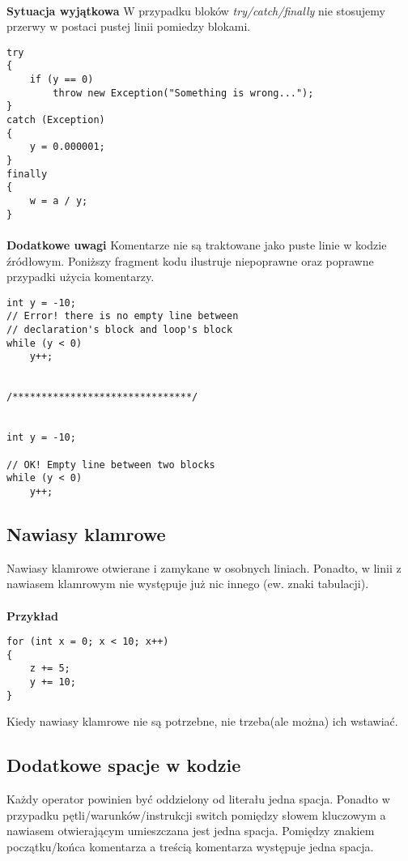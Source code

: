 \documentclass[titlepage]{article}
\begin{document}
\paragraph{}
\textbf{Sytuacja wyjątkowa}
W przypadku bloków \textit{try/catch/finally} nie stosujemy przerwy w postaci pustej linii pomiedzy blokami.
\begin{lstlisting}
try
{
	if (y == 0)
		throw new Exception("Something is wrong...");
}
catch (Exception)
{
	y = 0.000001;
}
finally
{
	w = a / y;
}
\end{lstlisting}
\paragraph{}
\textbf{Dodatkowe uwagi}
Komentarze nie są traktowane jako puste linie w kodzie źródłowym. Poniższy fragment kodu ilustruje niepoprawne oraz poprawne przypadki użycia komentarzy.
\begin{lstlisting}
int y = -10;
// Error! there is no empty line between
// declaration's block and loop's block
while (y < 0)
	y++;


/*******************************/


int y = -10;

// OK! Empty line between two blocks
while (y < 0)
	y++;
\end{lstlisting}
\subsection{Nawiasy klamrowe}
Nawiasy klamrowe otwierane i zamykane w osobnych liniach. Ponadto, w linii z nawiasem klamrowym nie występuje już nic innego (ew. znaki tabulacji).

\paragraph{}
\textbf{Przykład}
\begin{lstlisting}
for (int x = 0; x < 10; x++)
{
	z += 5;
	y += 10;
}
\end{lstlisting}
Kiedy nawiasy klamrowe nie są potrzebne, nie trzeba(ale można) ich wstawiać.

\subsection{Dodatkowe spacje w kodzie}
Każdy operator powinien być oddzielony od literału jedna spacja. Ponadto w przypadku pętli/warunków/instrukcji switch pomiędzy słowem kluczowym a nawiasem otwierającym umieszczana jest jedna spacja. Pomiędzy znakiem początku/końca komentarza a treścią komentarza występuje jedna spacja.
\end{document}
